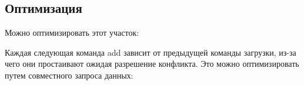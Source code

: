         \subsection{Оптимизация}
        
            Можно оптимизировать этот участок:
            
            
            Каждая следующая команда add зависит от предыдущей команды загрузки, из-за чего они простаивают ожидая разрешение конфликта. Это можно оптимизировать путем совместного запроса данных:
            
            

            

